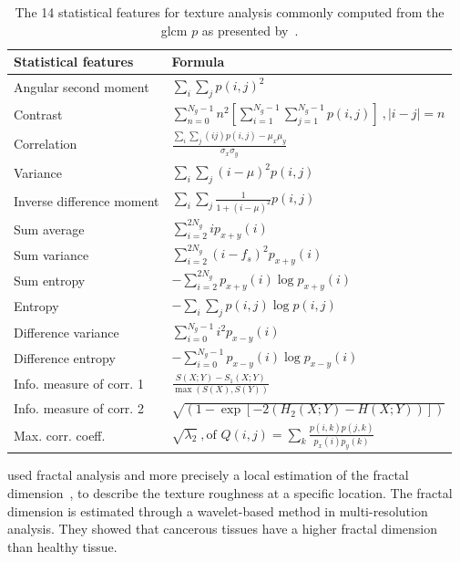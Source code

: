 \begin{table}
  \caption[The 14 statistical features used in conjunction with \acs*{glcm} analysis.]{The 14 statistical features for texture analysis commonly computed from the \acs*{glcm} $p$ as presented by~\cite{Haralick1973}.}
  \scriptsize
  \renewcommand{\arraystretch}{1.5}
  \centering
  \begin{tabular}{ll}
    \toprule
    \textbf{Statistical features} & \textbf{Formula} \\
    \midrule
    Angular second moment & $\sum_i \sum_j p(i,j)^2 $  \\
    Contrast & $\sum_{n=0}^{N_g - 1} n^2 \left[ \sum_{i=1}^{N_g - 1} \sum_{j=1}^{N_g - 1} p(i,j) \right] \ , | i-j |=n  $ \\
    Correlation & $\frac{\sum_i \sum_j (ij) p(i,j) - \mu_x \mu_y}{\sigma_x \sigma_y}  $ \\
    Variance & $\sum_i \sum_j (i - \mu)^2 p(i,j)  $ \\
    Inverse difference moment & $\sum_i \sum_j \frac{1}{1+(i - \mu)^2} p(i,j)  $ \\
    Sum average & $\sum_{i=2}^{2N_g} i p_{x+y}(i)  $ \\
    Sum variance & $\sum_{i=2}^{2N_g} (i-f_s)^2 p_{x+y}(i)  $ \\
    Sum entropy & $ - \sum_{i=2}^{2N_g} p_{x+y}(i) \log p_{x+y}(i)  $ \\
    Entropy & $ - \sum_i \sum_j p(i,j) \log p(i,j) $ \\
    Difference variance & $\sum_{i=0}^{N_g-1} i^2 p_{x-y}(i)  $ \\
    Difference entropy & $ - \sum_{i=0}^{N_g-1} p_{x-y}(i) \log p_{x-y}(i)  $ \\
    Info. measure of corr. 1 & $\frac{S(X;Y)-S_1(X;Y)}{\max(S(X),S(Y))}  $ \\
    Info. measure of corr. 2 & $\sqrt{\left( 1 - \exp \left[ -2( H_2(X;Y) - H(X;Y) ) \right] \right)}  $ \\
    Max. corr. coeff. & $ \sqrt{\lambda_2} \ , \text{of } Q(i,j) = \sum_k \frac{p(i,k)p(j,k)}{p_x(i)p_y(k)}  $ \\
    \bottomrule
  \end{tabular}
  \label{tab:glcm}
\end{table}

\citeauthor{Lopes2011} used fractal analysis  and more precisely a local estimation of the fractal dimension~\cite{Benassi1998}, to describe the texture roughness at a specific location.
The fractal dimension is estimated through a wavelet-based method in multi-resolution analysis.
They showed that cancerous tissues have a higher fractal dimension than healthy tissue.

